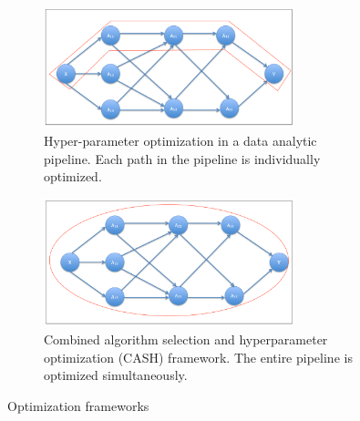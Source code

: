 \begin{figure}[ht!]
\begin{adjustbox}{right}
   \begin{subfigure}{\columnwidth}
   \centering
      \includegraphics[width=0.8\textwidth]{img/EP/HPO}
      \caption{Hyper-parameter optimization in a data analytic pipeline. Each path in the pipeline is individually optimized.}
      \label{fig:HPO}
   \end{subfigure}
\end{adjustbox}

\begin{adjustbox}{right}
   \begin{subfigure}{\columnwidth}
   \centering
      \includegraphics[width=0.8\textwidth]{img/EP/CASH}
      \caption{Combined algorithm selection and hyperparameter optimization (CASH) framework. The entire pipeline is optimized simultaneously.}
      \label{fig:CASH}
   \end{subfigure}
\end{adjustbox}
\caption{Optimization frameworks}\label{fig:frameworks}
\end{figure}




